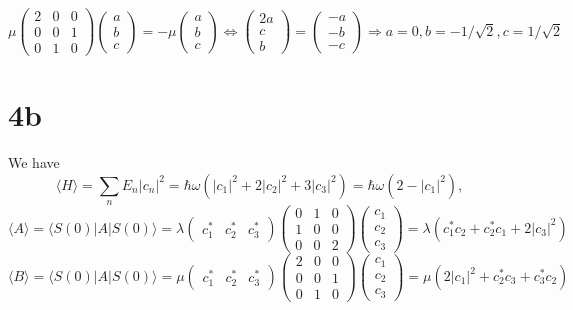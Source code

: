 \documentclass{article}
\begin{document}
\[
      \mu
  \begin{pmatrix}
    2 & 0 & 0 \\
    0 & 0 & 1 \\
    0 & 1 & 0
  \end{pmatrix}
  \begin{pmatrix}
    a \\
    b \\
    c
  \end{pmatrix}
  =-\mu
  \begin{pmatrix}
    a \\
    b \\
    c
  \end{pmatrix}
  \Leftrightarrow
  \begin{pmatrix}
     2a \\
     c \\
     b
  \end{pmatrix}
  =
  \begin{pmatrix}
    -a \\
    -b \\
    -c
  \end{pmatrix}
  \Rightarrow a=0, b=-1/\sqrt{2}, c=1/\sqrt{2}
\]

\section*{4b}
We have
\[
  \langle H \rangle=\sum_{n}E_{n}|c_{n}|^{2}
  =\hbar\omega\left(|c_{1}|^{2}+ 2|c_{2}|^{2}+3|c_{3}|^{2}\right)
  =\hbar\omega(2-|c_{1}|^{2}),
\]
\[
  \langle A \rangle=\langle S(0)|A|S(0) \rangle
  =\lambda
  \begin{pmatrix}
    c_{1}^{*} & c_{2}^{*} & c_{3}^{*}
  \end{pmatrix}
  \begin{pmatrix}
    0 & 1 & 0 \\
    1 & 0 & 0 \\
    0 & 0 & 2
  \end{pmatrix}
  \begin{pmatrix}
    c_{1} \\
    c_{2} \\
    c_{3}
  \end{pmatrix}
  = \lambda\left(c_{1}^{*}c_{2}+c_{2}^{*}c_{1}+2|c_{3}|^{2}\right)
\]
\[
    \langle B \rangle=\langle S(0)|A|S(0) \rangle
  =\mu
  \begin{pmatrix}
    c_{1}^{*} & c_{2}^{*} & c_{3}^{*}
  \end{pmatrix}
  \begin{pmatrix}
    2 & 0 & 0 \\
    0 & 0 & 1 \\
    0 & 1 & 0
  \end{pmatrix}
  \begin{pmatrix}
    c_{1} \\
    c_{2} \\
    c_{3}
  \end{pmatrix}
  = \mu\left( 2|c_{1}|^{2}+c_{2}^{*}c_{3}+c_{3}^{*}c_{2} \right)
\]
\end{document}
